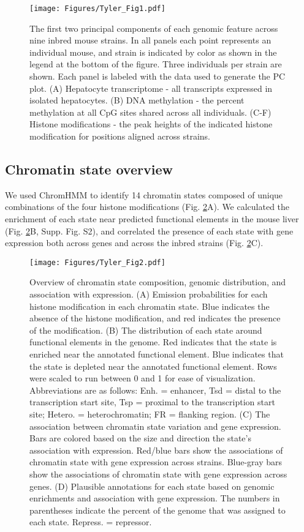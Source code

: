 \documentclass[
  11pt,
]{article}
\begin{document}
\begin{figure}[ht!]
\texttt{[image: Figures/Tyler\_Fig1.pdf]} 
\caption{The first two principal components of each genomic 
feature across nine inbred mouse strains. In all panels each 
point represents an individual mouse, and strain is indicated 
by color as shown in the legend at the bottom of the figure. 
Three individuals per strain are shown. Each panel is labeled 
with the data used to generate the PC plot. (A) Hepatocyte 
transcriptome - all transcripts expressed in isolated hepatocytes. 
(B) DNA methylation - the percent methylation at all CpG sites 
shared across all individuals. (C-F) Histone modifications - 
the peak heights of the indicated histone modification for
positions aligned across strains.}
\label{fig:pc_plots}
\end{figure}

\hypertarget{chromatin-state-overview}{%
\subsection{Chromatin state overview}\label{chromatin-state-overview}}

We used ChromHMM to identify 14 chromatin states composed of unique
combinations of the four histone modifications (Fig.
\ref{fig:state_overview}A). We calculated the enrichment of each state
near predicted functional elements in the mouse liver (Fig.
\ref{fig:state_overview}B, Supp. Fig. S2), and correlated the presence
of each state with gene expression both across genes and across the
inbred strains (Fig. \ref{fig:state_overview}C).

\begin{figure}[ht!]
\texttt{[image: Figures/Tyler\_Fig2.pdf]} 
\caption{Overview of chromatin state composition, genomic 
distribution, and association with expression. (A) Emission 
probabilities for each histone modification in each 
chromatin state. Blue indicates the absence of the histone
modification, and red indicates the presence of the 
modification. (B) The distribution of each state 
around functional elements in the genome. Red indicates that 
the state is enriched near the annotated functional element. 
Blue indicates that the state is depleted near the annotated 
functional element. Rows were scaled to run between 0 and 1
for ease of visualization. Abbreviations are as follows: 
Enh. = enhancer, Tsd = distal to the transcription start site, 
Tsp = proximal to the transcription start site; Hetero. = 
heterochromatin; FR = flanking region. (C) The association between 
chromatin state variation and gene expression. Bars are colored 
based on the size and direction the state's association with expression. 
Red/blue bars show the associations of chromatin state with gene
expression across strains. Blue-gray bars show the associations of
chromatin state with gene expression across genes. (D) Plausible 
annotations for each state based on genomic enrichments and association
with gene expression. The numbers in parentheses indicate the percent 
of the genome that was assigned to each state. Repress. = repressor.}
\label{fig:state_overview}
\end{figure}
\end{document}
